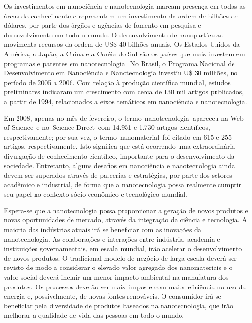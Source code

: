 \documentclass[10pt]{scrartcl}
\begin{document}
Os investimentos em nanociência e nanotecnologia marcam presença em todas as áreas do conhecimento e representam um investimento da ordem de bilhões de dólares, por parte dos órgãos e agências de fomento em pesquisa e desenvolvimento em todo o mundo. O desenvolvimento de nanopartículas movimenta recursos da ordem de US\$ 40 bilhões anuais. Os Estados Unidos da América, o Japão, a China e a Coréia do Sul são os países que mais investem em programas e patentes em nanotecnologia. No Brasil, o Programa Nacional de Desenvolvimento em Nanociência e Nanotecnologia investiu U\$ 30 milhões, no período de 2005 a 2006. Com relação à produção científica mundial, estudos preliminares indicaram um crescimento com cerca de 130 mil artigos publicados, a partir de 1994, relacionados a eixos temáticos em nanociência e nanotecnologia.

Em 2008, apenas no mês de fevereiro, o termo nanotecnologia apareceu na Web of Science e no Science Direct com 14.951 e 1.730 artigos científicos, respectivamente; por sua vez, o termo nanomaterial foi citado em 615 e 255 artigos, respectivamente. Isto significa que está ocorrendo uma extraordinária divulgação de conhecimento científico, importante para o desenvolvimento da sociedade. Entretanto, alguns desafios em nanociência e nanotecnologia ainda devem ser superados através de parcerias e estratégias, por parte dos setores acadêmico e industrial, de forma que a nanotecnologia possa realmente cumprir seu papel no contexto sócio-econômico e tecnológico mundial.

Espera-se que a nanotecnologia possa proporcionar a geração de novos produtos e novas oportunidades de mercado, através da integração da ciência e tecnologia. A maioria das indústrias atuais irá se beneficiar com as inovações da nanotecnologia. As colaborações e interações entre indústria, academia e instituições governamentais, em escala mundial, irão acelerar o desenvolvimento de novos produtos. O tradicional modelo de negócio de larga escala deverá ser revisto de modo a considerar o elevado valor agregado dos nanomateriais e o valor social deverá incluir um menor impacto ambiental na manufatura dos produtos. Os processos deverão ser mais limpos e com maior eficiência no uso da energia e, possivelmente, de novas fontes renováveis. O consumidor irá se beneficiar pela diversidade de produtos baseados na nanotecnologia, que irão melhorar a qualidade de vida das pessoas em todo o mundo.
\end{document}
